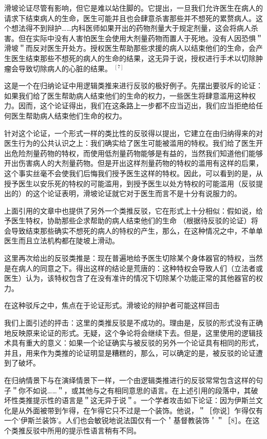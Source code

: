滑坡论证尽管有影响，但它是难以站住脚的。它提出，一旦我们允许医生在病人的请求下结束病人的生命，医生可能并且也会肆意杀害那些并不想死的累赘病人。这个想法得不到辩护……内科医师如果开出的药物剂量大于规定剂量，这会将病人杀害。但在实际中没有人害怕医生会使用大剂量药物而置人于死地。没有人因恐惧＂滑坡＂而反对医生开处方。授权医生帮助那些求援的病人以结束他们的生命，会产生医生结束那些不想死的病人的生命的结果，这无异于说，授权进行手术以切除肿瘤会导致切除病人的心脏的结果。 ${ }^{[7]}$

这是一个在归纳论证中用逻辑类推来进行反驳的极好例子。先摆出要驳斥的论证：如果我们给了医生帮助病人结束他们的生命的权力，一些医生将肆意滥用这种权力。因而，这个论证得出，我们在这条路上一步都不应当迈出，我们应当拒绝给任何医生帮助病人结束他们生命的权力。

针对这个论证，一个形式一样的类比性的反驳得以提出，它建立在由归纳得来的对医生行为的公共认识之上：我们确实给了医生可能被滥用的特权。我们给了医生开出危险剂量药物的特权，而使用低剂量药物能够是有益的，当然我们知道他们能够开出伤害病人的大剂量药物。但是开出这样剂量药物的特权的滥用有这样的后果，这个事实丝毫不会使我们后悔我们授予医生这样的特权。因此，可以看到的是，从授予医生以安乐死的特权的可能滥用，到授予医生以处方特权的可能滥用（反驳提出的）的这个论证表明，滑坡论证就它对于医生而言不是十分有说服力的。

上面引用的文章中也提供了另外一个类推反驳，它在形式上十分相似：假如说，给予医生特权，协助那些企求帮助的病人结束他们的生命 （根据待反驳的论证）将会导致结束那些确实不想死的病人的特权的产生，那么，在这种情况之中，不单单医生而且立法机构都在陡坡上滑动。

这里再次给出的反驳类推是：现在普遍地给予医生切除某个身体器官的特权，当然是在病人的同意之下。得出这样的结论是荒唐的：这种特权会导致人们（立法者或医生）认为，该特权包含了在没有准许的情况下切除某个功能正常的其他器官的权力。

在这种驳斥之中，焦点在于论证形式。滑坡论的辩护者可能这样回击

我们上面引述的抨击：这里的类推反驳是不成功的。理由是，反驳的形式没有正确地反映原来论证的形式。无疑，这个争论将会继续下去。但是，这里使用的逻辑技术具有重大的意义：如果一个论证确实与被反驳的另外一个论证具有相同的形式，并且，用来作为类推的论证明显是糟糕的，那么，可以确定的是，被反驳的论证遭到了破坏。

在归纳情景下与在演绎情景下一样，一个由逻辑类推进行的反驳常常包含这样的句子＂你不如说……＂，或其他与之有相同意思的语言。在上述引用的段落中，其破坏性类推提示性的语言是＂这无异于说＂。一个学者攻击如下论证：因为伊斯兰文化是从外面被带到乍得，在乍得它只不过是一个装饰。他说，＂［你说］乍得仅有一个'伊斯兰装饰'。人们也会敏锐地说法国仅有一个＇基督教装饰＇＂［8］。在这个类推反驳中所用的提示性语言稍有不同。

